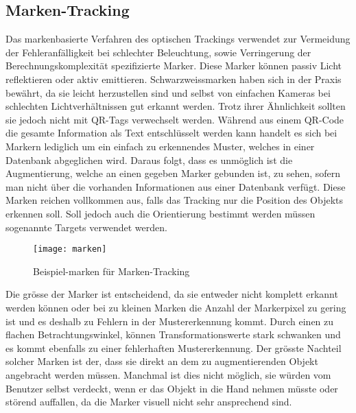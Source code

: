 \subsection*{Marken-Tracking}
Das markenbasierte Verfahren des optischen Trackings verwendet zur Vermeidung der Fehleranfälligkeit bei schlechter Beleuchtung, sowie Verringerung der Berechnungskomplexität spezifizierte Marker. Diese Marker können passiv Licht reflektieren oder aktiv emittieren. Schwarzweissmarken haben sich in der Praxis bewährt, da sie leicht herzustellen sind und selbst von einfachen Kameras bei schlechten Lichtverhältnissen gut erkannt werden. Trotz ihrer Ähnlichkeit sollten sie jedoch nicht mit QR-Tags verwechselt werden. Während aus einem QR-Code die gesamte Information als Text entschlüsselt werden kann handelt es sich bei Markern lediglich um ein einfach zu erkennendes Muster, welches in einer Datenbank abgeglichen wird. Daraus folgt, dass es unmöglich ist die Augmentierung, welche an einen gegeben Marker gebunden ist, zu sehen, sofern man nicht über die vorhanden Informationen aus einer Datenbank verfügt. Diese Marken reichen vollkommen aus, falls das Tracking nur die Position des Objekts erkennen soll. Soll jedoch auch die Orientierung bestimmt werden müssen sogenannte Targets verwendet werden.\cite[S.~104~ff.]{doerner13}
\newpage
\begin{wrapfigure}{r}{0.35\textwidth}
	\vspace{-15pt}
	\begin{center}
		\texttt{[image: marken]}
	\end{center}
	\vspace{-15pt}
	\captionsetup{width=0.3\textwidth}
	\caption{Beispiel-marken für Marken-Tracking}\label{marken}
	\vspace{-12pt}
\end{wrapfigure}
Die grösse der Marker ist entscheidend, da sie entweder nicht komplett erkannt werden können oder bei zu kleinen Marken die Anzahl der Markerpixel zu gering ist und es deshalb zu Fehlern in der Mustererkennung kommt. Durch einen zu flachen Betrachtungswinkel, können Transformationswerte stark schwanken und es kommt ebenfalls zu einer fehlerhaften Mustererkennung. Der grösste Nachteil solcher Marken ist der, dass sie direkt an dem zu augmentierenden Objekt angebracht werden müssen. Manchmal ist dies nicht möglich, sie würden vom Benutzer selbst verdeckt, wenn er das Objekt in die Hand nehmen müsste oder störend auffallen, da die Marker visuell nicht sehr ansprechend sind.\cite[S.~256~ff.]{doerner13}\\[6pt]

